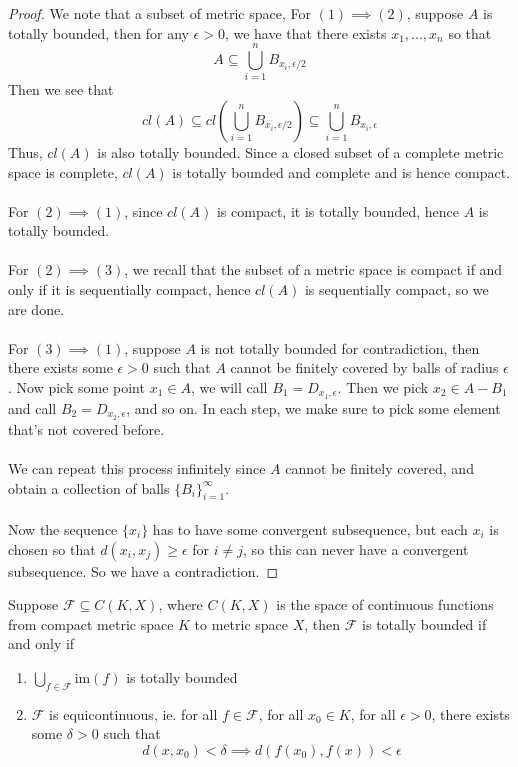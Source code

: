 \begin{proof}
    We note that a subset of metric space, 
    For $(1) \implies (2)$, suppose $A$ is totally bounded, then for any $\epsilon > 0$, we have that there exists $x_1, ..., x_n$ so that
    \[A \subseteq \bigcup_{i = 1}^n B_{x_i, \epsilon/2}\]
    Then we see that
    \[cl(A) \subseteq cl(\bigcup_{i = 1}^n B_{x_i, \epsilon/2}) \subseteq \bigcup_{i = 1}^n B_{x_i, \epsilon}\]
    Thus, $cl(A)$ is also totally bounded. Since a closed subset of a complete metric space is complete, $cl(A)$ is totally bounded and complete and is hence compact.\\\\
    For $(2) \implies (1)$, since $cl(A)$ is compact, it is totally bounded, hence $A$ is totally bounded.\\\\
    For $(2) \implies (3)$, we recall that the subset of a metric space is compact if and only if it is sequentially compact, hence $cl(A)$ is sequentially compact, so we are done.\\\\
    For $(3) \implies (1)$, suppose $A$ is not totally bounded for contradiction, then there exists some $\epsilon > 0$ such that $A$ cannot be finitely covered by balls of radius $\epsilon$. Now pick some point $x_1 \in A$, we will call $B_1 = D_{x_1, \epsilon}$. Then we pick $x_2 \in A - B_1$ and call $B_2 = D_{x_2, \epsilon}$, and so on. In each step, we make sure to pick some element that's not covered before.\\\\
    We can repeat this process infinitely since $A$ cannot be finitely covered, and obtain a collection of balls $\{B_i\}_{i = 1}^\infty$.\\\\
    Now the sequence $\{x_i\}$ has to have some convergent subsequence, but each $x_i$ is chosen so that $d(x_i, x_j) \geq \epsilon$ for $i \neq j$, so this can never have a convergent subsequence. So we have a contradiction.
\end{proof}

\begin{theorem}
    Suppose $\mathcal{F} \subseteq C(K, X)$, where $C(K, X)$ is the space of continuous functions from compact metric space $K$ to metric space $X$, then $\mathcal{F}$ is totally bounded if and only if
    \begin{enumerate}
        \item $\bigcup_{f \in \mathcal{F}} \text{im}(f)$ is totally bounded
        \item $\mathcal{F}$ is equicontinuous, ie. for all $f \in \mathcal{F}$, for all $x_0 \in K$, for all $\epsilon > 0$, there exists some $\delta > 0$ such that
        \[d(x, x_0) < \delta \implies d(f(x_0), f(x)) < \epsilon\]
    \end{enumerate}
\end{theorem}

